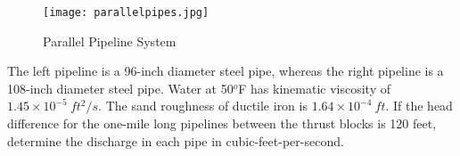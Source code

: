 \documentclass[12pt]{article}
\begin{document}
\begin{enumerate}
\begin{figure}[htbp] %
   \centering
   \texttt{[image: parallelpipes.jpg]} 
   \caption{Parallel Pipeline System}
   \label{fig:parallelpipes}
\end{figure}

The left pipeline is a 96-inch diameter steel pipe, whereas the right pipeline is a 108-inch diameter steel pipe.  
Water at 50$^o$F has kinematic viscosity of $1.45\times10^{-5}~ft^2/s$.   
The sand roughness of ductile iron is $1.64\times10^{-4}~ft$.   
If the head difference for the one-mile long pipelines between the thrust blocks is 120 feet, determine the discharge in each pipe in cubic-feet-per-second.


%
%
%


\end{enumerate}
\end{document}

